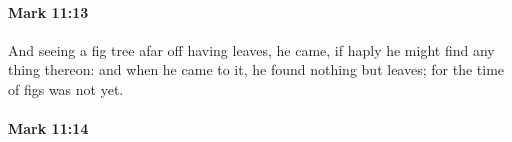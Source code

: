 		\paragraph{Mark 11:13} %
			\label{MARK-11-13}

			And seeing a fig tree afar off having leaves, he came, if haply he might find any thing thereon: and when he came to it, he found nothing but leaves; for the time of figs was not yet.

			\begin{framed}
			\scriptsize
				\begin{compactdesc}
					\item[SBLG] 
				\end{compactdesc}
			\end{framed}

		\paragraph{Mark 11:14} %
			\label{MARK-11-14}

